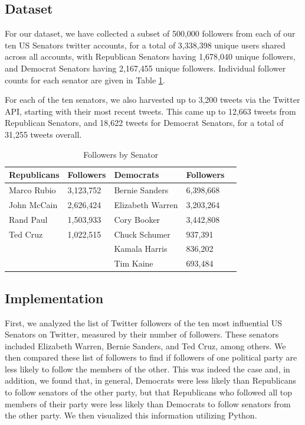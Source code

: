 \documentclass[journal]{IEEEtran}
\begin{document}
	\subsection{Dataset}
	
	For our dataset, we have collected a subset of 500,000 followers from each of our ten US Senators twitter accounts, for a total of 3,338,398 unique users shared across all accounts, with Republican Senators having 1,678,040 unique followers, and Democrat Senators having 2,167,455 unique followers. Individual follower counts for each senator are given in Table \ref{senatorTable}.
	
	For each of the ten senators, we also harvested up to 3,200 tweets via the Twitter API, starting with their most recent tweets. This came up to 12,663 tweets from Republican Senators, and 18,622 tweets for Democrat Senators, for a total of 31,255 tweets overall.
	
	\begin{table}[htp]
		\centering
		\caption{Followers by Senator}
		\label{senatorTable}
		\begin{tabular}{ll|lll}
			\hline
			Republicans & Followers & Democrats        & Followers &  \\ \hline
			Marco Rubio & 3,123,752 & Bernie Sanders   & 6,398,668 &  \\
			John McCain & 2,626,424 & Elizabeth Warren & 3,203,264 &  \\
			Rand Paul   & 1,503,933 & Cory Booker      & 3,442,808 &  \\
			Ted Cruz    & 1,022,515 & Chuck Schumer    & 937,391   &  \\
			&           & Kamala Harris    & 836,202   &  \\
			&           & Tim Kaine        & 693,484   &  \\ \cline{1-4}
		\end{tabular}
	\end{table}
	
	\subsection{Implementation}
	
	First, we analyzed the list of Twitter followers of the ten most influential US Senators on Twitter, measured by their number of followers. These senators included Elizabeth Warren, Bernie Sanders, and Ted Cruz, among others. We then compared these list of followers to find if followers of one political party are less likely to follow the members of the other. This was indeed the case and, in addition, we found that, in general, Democrats were less likely than Republicans to follow senators of the other party, but that Republicans who followed all top members of their party were less likely than Democrats to follow senators from the other party. We then visualized this information utilizing Python.  
	
\end{document}
